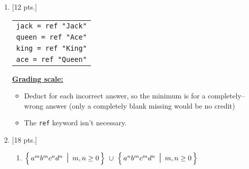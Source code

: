 \documentclass[11pt,fleqn]{article}
\begin{document}
  \begin{enumerate}

    \addtolength{\itemsep}{20mm}

    \item {[12 pts.]}

          \begin{tabular}[t]{l}

            \texttt{jack = ref "Jack"}
              \\

            \texttt{queen = ref "Ace"}
              \\

            \texttt{king = ref "King"}
              \\

            \texttt{ace = ref "Queen"}
              \\

          \end{tabular}

          \begin{info}{\textbf{\underline{Grading scale:}}}

            \begin{itemize}

              \addtolength{\itemsep}{2mm}

              \item Deduct  for each incorrect answer, so the
                    minimum is  for a completely--wrong answer (only
                    a completely blank missing would be no credit)

              \item The \texttt{ref} keyword isn't necessary.

            \end{itemize}

          \end{info}

    \item {[18 pts.]}

          \vspace{-1mm}

          \begin{enumerate}

            \addtolength{\itemsep}{6mm}

            \item \(
                    \left\{ \,
                      a^mb^mc^nd^n \mbox{\Large \ensuremath{\ \mid \ }} m, n \ge 0  \,
                    \right\}
                    \ \cup \
                    \left\{  \,
                      a^nb^mc^md^n \mbox{\Large \ensuremath{\ \mid \ }} m, n \ge 0  \,
                    \right\}
                  \)


\end{enumerate}
\end{enumerate}
\end{document}
